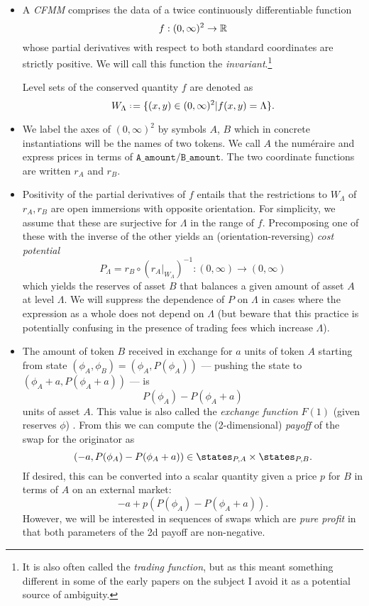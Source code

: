 \documentclass[a4paper,11pt]{article}
\begin{document}
\begin{itemize}
  \item 
    A \emph{CFMM} comprises the data of a twice continuously differentiable function 
    \[
       f:(0,\infty)^2 \rightarrow \mathbb R
    \]
    whose partial derivatives with respect to both standard coordinates are strictly positive.
    We will call this function the \emph{invariant}.\footnote{It is also often called the \emph{trading function}, but as this meant something different in some of the early papers on the subject I avoid it as a potential source of ambiguity.}
  
  
    Level sets of the conserved quantity $f$ are denoted as
    \[
      W_\Lambda \defeq \{(x,y)\in (0,\infty)^2|f(x,y)=\Lambda\}.
    \]
    
  \item
    We label the axes of $(0,\infty)^2$ by symbols $A$, $B$ which in concrete instantiations will be the names of two tokens. 
    We call $A$ the num\'eraire and express prices in terms of $\mathtt{A\_amount/B\_amount}$. 
    The two coordinate functions are written $r_A$ and $r_B$.
  
  \item
    Positivity of the partial derivatives of $f$ entails that the restrictions to $W_\Lambda$ of $r_A,r_B$ are open immersions with opposite orientation. For simplicity, we assume that these are surjective for $\Lambda$ in the range of $f$.
    Precomposing one of these with the inverse of the other yields an (orientation-reversing) \emph{cost potential}
    \[
      P_\Lambda = r_B\circ ( r_A|_{W_\Lambda})^{-1}:(0,\infty)\rightarrow (0,\infty)
    \]
    which yields the reserves of asset $B$ that balances a given amount of asset $A$ at level $\Lambda$.%
    We will suppress the dependence of $P$ on $\Lambda$ in cases where the expression as a whole does not depend on $\Lambda$ (but beware that this practice is potentially confusing in the presence of trading fees which increase $\Lambda$).

  \item
    The amount of token $B$ received in exchange for $a$ units of token $A$ starting from state $(\phi_A,\phi_B) = (\phi_A,P(\phi_A))$ --- pushing the state to $(\phi_A+a,P(\phi_A+a))$ --- is
    \[
      P(\phi_A) - P(\phi_A+a)
    \]
    units of asset $A$. This value is also called the \emph{exchange function} $F(1)$ (given reserves $\phi$) \cite[\S4.1]{angeris2022constant}.
    From this we can compute the (2-dimensional) \emph{payoff} of the swap for the originator as
    \begin{equation} \label{payoff}
      (-a, P(\phi_A) - P(\phi_A+a)) \in \states_{P,A}\times\states_{P,B}.
    \end{equation}
    If desired, this can be converted into a scalar quantity given a price $p$ for $B$ in terms of $A$ on an external market:
    \begin{equation} \label{payoff-1d}
      -a + p(P(\phi_A) - P(\phi_A+a)).
    \end{equation}
    However, we will be interested in sequences of swaps which are \emph{pure profit} in that both parameters of the 2d payoff are non-negative.
    

\end{itemize}
\end{document}
